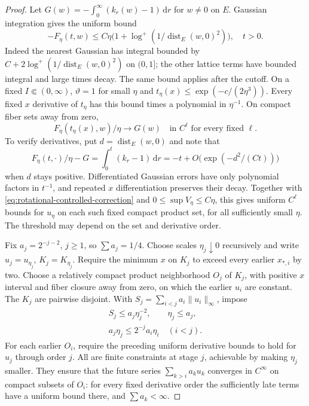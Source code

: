 \begin{proof}
Let $G(w)=-\int_0^\infty(k_r(w)-1)\,\mathrm dr$ for $w\ne0$ on $E$.
Gaussian integration gives the uniform bound
\begin{equation}\label{eq:rotational-off-pole-value}
 -F_\eta(t,w)\leq
 C\eta\bigl(1+\log^+(1/\operatorname{dist}_E(w,0)^2)\bigr),\quad t>0.
\end{equation}
Indeed the nearest Gaussian has integral bounded by
$C+2\log^+(1/\operatorname{dist}_E(w,0)^2)$ on $(0,1]$;
the other lattice terms have bounded integral and large times decay.
The same bound applies after the cutoff.
On a fixed $I\Subset(0,\infty)$, $\vartheta=1$ for small $\eta$ and
$t_\eta(x)\leq\exp(-c/(2\eta^3))$.
Every fixed $x$ derivative of $t_\eta$ has this bound times a polynomial
in $\eta^{-1}$. On compact fiber sets away from zero,
\[
 F_\eta(t_\eta(x),w)/\eta\longrightarrow G(w)
                   \quad\text{in }C^\ell\text{ for every fixed }\ell.
\]
To verify derivatives, put $d=\operatorname{dist}_E(w,0)$ and note that
\[
 F_\eta(t,\cdot)/\eta-G=\int_0^t(k_r-1)\,\mathrm dr=-t+O\bigl(\exp(-d^2/(Ct))\bigr)
\]
when $d$ stays positive. Differentiated Gaussian errors have only polynomial
factors in $t^{-1}$, and repeated $x$ differentiation preserves their decay.
Together with \eqref{eq:rotational-controlled-correction} and $0\leq\sup V_\eta\leq C\eta$,
this gives uniform $C^\ell$ bounds for $u_\eta$ on each such fixed compact
product set, for all sufficiently small $\eta$. The threshold may depend
on the set and derivative order.

Fix $a_j=2^{-j-2}$, $j\geq1$, so $\sum a_j=1/4$.
Choose scales $\eta_j\downarrow0$ recursively and write
$u_j=u_{\eta_j}$, $K_j=K_{\eta_j}$.
Require the minimum $x$ on $K_j$ to exceed every earlier $x_{*,i}$ by two.
Choose a relatively compact product neighborhood $O_j$ of $K_j$, with
positive $x$ interval and fiber closure away from zero, on which the earlier
$u_i$ are constant. The $K_j$ are pairwise disjoint.
With $S_j=\sum_{i<j}a_i\|u_i\|_\infty$, impose
\begin{gather*}
 S_j\leq a_j\eta_j^{-2},\qquad \eta_j\leq a_j,\\
 a_j\eta_j\leq2^{-j}a_i\eta_i\quad(i<j).
\end{gather*}
For each earlier $O_i$, require the preceding uniform derivative bounds to
hold for $u_j$ through order $j$. All are finite constraints at stage $j$,
achievable by making $\eta_j$ smaller. They ensure that the future series
$\sum_{k>i}a_ku_k$ converges in $C^\infty$ on compact subsets of $O_i$:
for every fixed derivative order the sufficiently late terms have a uniform
bound there, and $\sum a_k<\infty$.


\end{proof}
